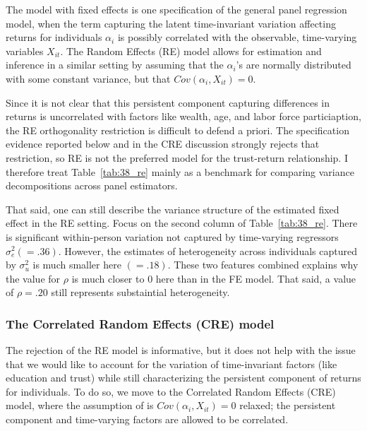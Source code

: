 \par The model with fixed effects is one specification of the general panel regression model, when the term capturing the latent time-invariant variation affecting returns for individuals $\alpha_i$ is possibly correlated with the observable, time-varying variables $X_{it}$. The Random Effects (RE) model allows for estimation and inference in a similar setting by assuming that the $\alpha_i$'s are normally distributed with some constant variance, but that $Cov(\alpha_i, X_{it}) = 0$.

\par Since it is not clear that this persistent component capturing differences in returns is uncorrelated with factors like wealth, age, and labor force particiaption, the RE orthogonality restriction is difficult to defend a priori. The specification evidence reported below and in the CRE discussion strongly rejects that restriction, so RE is not the preferred model for the trust-return relationship. I therefore treat Table~\ref{tab:38_re} mainly as a benchmark for comparing variance decompositions across panel estimators.

\par That said, one can still describe the variance structure of the estimated fixed effect in the RE setting. Focus on the second column of Table~\ref{tab:38_re}. There is significant within-person variation not captured by time-varying regressors $\sigma_e^2(=.36)$. However, the estimates of heterogeneity across individuals captured by $\sigma_u^2$ is much smaller here $(=.18)$. These two features combined explains why the value for $\rho$ is much closer to $0$ here than in the FE model. That said, a value of $\rho=.20$ still represents substaintial heterogeneity.

\FloatBarrier

\subsubsection{The Correlated Random Effects (CRE) model}

\par The rejection of the RE model is informative, but it does not help with the issue that we would like to account for the variation of time-invariant factors (like education and trust) while still characterizing the persistent component of returns for individuals. To do so, we move to the Correlated Random Effects (CRE) model, where the assumption of is $Cov(\alpha_i, X_{it}) = 0$ relaxed; the persistent component and time-varying factors are allowed to be correlated. 


